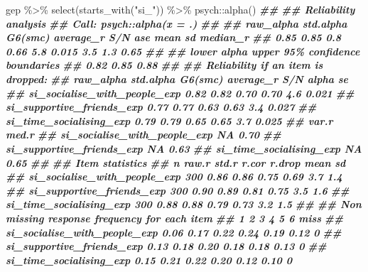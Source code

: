 \documentclass[
]{book}
\newenvironment{Shaded}{\begin{snugshade}}{\end{snugshade}}
\newcommand{\DocumentationTok}[1]{\textcolor[rgb]{0.56,0.35,0.01}{\textbf{\textit{#1}}}}
\newcommand{\FunctionTok}[1]{\textcolor[rgb]{0.00,0.00,0.00}{#1}}
\newcommand{\NormalTok}[1]{#1}
\newcommand{\SpecialCharTok}[1]{\textcolor[rgb]{0.00,0.00,0.00}{#1}}
\newcommand{\StringTok}[1]{\textcolor[rgb]{0.31,0.60,0.02}{#1}}
\begin{document}
\begin{Shaded}
\begin{Highlighting}[]
\NormalTok{gep }\SpecialCharTok{\%\textgreater{}\%}
  \FunctionTok{select}\NormalTok{(}\FunctionTok{starts\_with}\NormalTok{(}\StringTok{"si\_"}\NormalTok{)) }\SpecialCharTok{\%\textgreater{}\%}
\NormalTok{  psych}\SpecialCharTok{::}\FunctionTok{alpha}\NormalTok{()}
\DocumentationTok{\#\# }
\DocumentationTok{\#\# Reliability analysis   }
\DocumentationTok{\#\# Call: psych::alpha(x = .)}
\DocumentationTok{\#\# }
\DocumentationTok{\#\#   raw\_alpha std.alpha G6(smc) average\_r S/N   ase mean  sd median\_r}
\DocumentationTok{\#\#       0.85      0.85     0.8      0.66 5.8 0.015  3.5 1.3     0.65}
\DocumentationTok{\#\# }
\DocumentationTok{\#\#  lower alpha upper     95\% confidence boundaries}
\DocumentationTok{\#\# 0.82 0.85 0.88 }
\DocumentationTok{\#\# }
\DocumentationTok{\#\#  Reliability if an item is dropped:}
\DocumentationTok{\#\#                              raw\_alpha std.alpha G6(smc) average\_r S/N alpha se}
\DocumentationTok{\#\# si\_socialise\_with\_people\_exp      0.82      0.82    0.70      0.70 4.6    0.021}
\DocumentationTok{\#\# si\_supportive\_friends\_exp         0.77      0.77    0.63      0.63 3.4    0.027}
\DocumentationTok{\#\# si\_time\_socialising\_exp           0.79      0.79    0.65      0.65 3.7    0.025}
\DocumentationTok{\#\#                              var.r med.r}
\DocumentationTok{\#\# si\_socialise\_with\_people\_exp    NA  0.70}
\DocumentationTok{\#\# si\_supportive\_friends\_exp       NA  0.63}
\DocumentationTok{\#\# si\_time\_socialising\_exp         NA  0.65}
\DocumentationTok{\#\# }
\DocumentationTok{\#\#  Item statistics }
\DocumentationTok{\#\#                                n raw.r std.r r.cor r.drop mean  sd}
\DocumentationTok{\#\# si\_socialise\_with\_people\_exp 300  0.86  0.86  0.75   0.69  3.7 1.4}
\DocumentationTok{\#\# si\_supportive\_friends\_exp    300  0.90  0.89  0.81   0.75  3.5 1.6}
\DocumentationTok{\#\# si\_time\_socialising\_exp      300  0.88  0.88  0.79   0.73  3.2 1.5}
\DocumentationTok{\#\# }
\DocumentationTok{\#\# Non missing response frequency for each item}
\DocumentationTok{\#\#                                 1    2    3    4    5    6 miss}
\DocumentationTok{\#\# si\_socialise\_with\_people\_exp 0.06 0.17 0.22 0.24 0.19 0.12    0}
\DocumentationTok{\#\# si\_supportive\_friends\_exp    0.13 0.18 0.20 0.18 0.18 0.13    0}
\DocumentationTok{\#\# si\_time\_socialising\_exp      0.15 0.21 0.22 0.20 0.12 0.10    0}
\end{Highlighting}
\end{Shaded}
\end{document}
